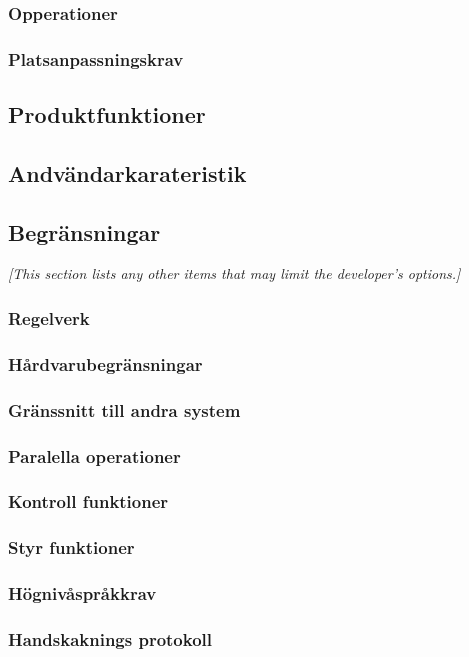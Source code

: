 \documentclass{article}
\begin{document}
\begin{enumerate}
\subsubsection{Opperationer}
\subsubsection{Platsanpassningskrav}

\subsection{Produktfunktioner}

\subsection{Andvändarkarateristik}

\subsection{Begränsningar}
\emph{[This section lists any other items that may limit the developer's
  options.]}

\subsubsection{Regelverk}
\subsubsection{Hårdvarubegränsningar}
\subsubsection{Gränssnitt till andra system}
\subsubsection{Paralella operationer}
\subsubsection{Kontroll funktioner}
\subsubsection{Styr funktioner}
\subsubsection{Högnivåspråkkrav}
\subsubsection{Handskaknings protokoll}

\end{enumerate}
\end{document}
